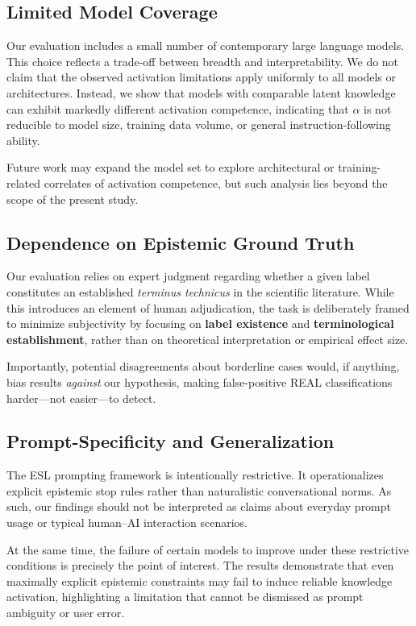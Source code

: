 \subsection{Limited Model Coverage}

Our evaluation includes a small number of contemporary large language models. This choice reflects a trade-off between breadth and interpretability. We do not claim that the observed activation limitations apply uniformly to all models or architectures. Instead, we show that models with comparable latent knowledge can exhibit markedly different activation competence, indicating that $\alpha$ is not reducible to model size, training data volume, or general instruction-following ability.

Future work may expand the model set to explore architectural or training-related correlates of activation competence, but such analysis lies beyond the scope of the present study.


\subsection{Dependence on Epistemic Ground Truth}

Our evaluation relies on expert judgment regarding whether a given label constitutes an established \emph{terminus technicus} in the scientific literature. While this introduces an element of human adjudication, the task is deliberately framed to minimize subjectivity by focusing on \textbf{label existence} and \textbf{terminological establishment}, rather than on theoretical interpretation or empirical effect size.

Importantly, potential disagreements about borderline cases would, if anything, bias results \emph{against} our hypothesis, making false-positive REAL classifications harder---not easier---to detect.


\subsection{Prompt-Specificity and Generalization}

The ESL prompting framework is intentionally restrictive. It operationalizes explicit epistemic stop rules rather than naturalistic conversational norms. As such, our findings should not be interpreted as claims about everyday prompt usage or typical human--AI interaction scenarios.

At the same time, the failure of certain models to improve under these restrictive conditions is precisely the point of interest. The results demonstrate that even maximally explicit epistemic constraints may fail to induce reliable knowledge activation, highlighting a limitation that cannot be dismissed as prompt ambiguity or user error.


